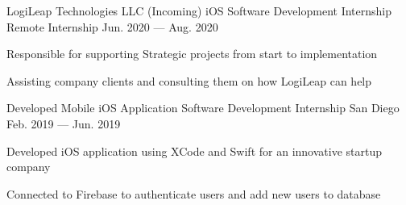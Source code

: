 

\begin{cventries}

  \cventry
    {LogiLeap Technologies LLC} %
    {(Incoming) iOS Software Development Internship} %
    {Remote Internship} %
    {Jun. 2020 — Aug. 2020} %
    {
      \begin{cvitems} %
        \item {Responsible for supporting Strategic projects from start to implementation}
        \item {Assisting company clients and consulting them on how LogiLeap can help}
      \end{cvitems}
    }


  \cventry
    {Developed Mobile iOS Application} %
    {Software Development Internship} %
    {San Diego} %
    {Feb. 2019 — Jun. 2019} %
    {
      \begin{cvitems} %
        \item {Developed iOS application using XCode and Swift for an innovative startup company}
        \item {Connected to Firebase to authenticate users and add new users to database}
      \end{cvitems}
    }



    
\end{cventries}
